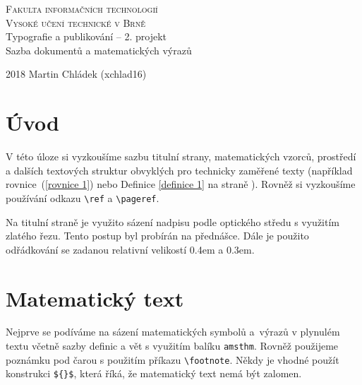 \documentclass[11pt, a4paper, twocolumn]{article}
\author{Martin Chládek}
\date{6.3.2018}
\begin{document}
\begin{titlepage}
\begin{center}
    
\textsc{\Huge Fakulta informačních technologií\\[0.4em]
Vysoké učení technické v Brně} \\
{\LARGE Typografie a publikování -- 2. projekt\\[0.3em] Sazba dokumentů a matematických výrazů}\\ 
\end{center}
{\Large 2018 \hfill Martin Chládek (xchlad16)}

\end{titlepage}

\newpage
\section*{Úvod}\label{strana 1}
V této úloze si vyzkoušíme sazbu titulní strany, matematických
vzorců, prostředí a dalších textových struktur obvyklých
pro technicky zaměřené texty (například rovnice~(\ref{rovnice 1})
nebo Definice \ref{definice 1} na straně \pageref{strana 1}). Rovněž si vyzkoušíme používání
odkazu \verb|\ref| a \verb|\pageref|.

Na titulní straně je využito sázení nadpisu podle optického středu s využitím zlatého řezu. Tento postup byl probírán na přednášce. Dále je použito odřádkování se zadanou relativní velikostí 0.4em a 0.3em.

\section{Matematický text}
Nejprve se podíváme na sázení matematických symbolů a~výrazů v plynulém textu včetně sazby definic a vět s využitím balíku \verb|amsthm|. Rovněž použijeme poznámku pod čarou s použitím příkazu \verb|\footnote|. Někdy je vhodné použít konstrukci \verb|${}$|, která říká, že matematický text nemá být zalomen.
\end{document}
